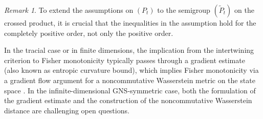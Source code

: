 \documentclass[12pt,a4paper]{amsart}
\newcommand{\1}{\mathds{1}}
\theoremstyle{plain}
\theoremstyle{definition}
\theoremstyle{remark}
\newtheorem{remark}[proposition]{Remark}
\begin{document}
\begin{remark}
    To extend the assumptions on $(P_t)$ to the semigroup $(\tilde P_t)$ on the crossed product, it is crucial that the inequalities in the assumption hold for the completely positive order, not only the positive order.

    In the tracial case or in finite dimensions, the implication from the intertwining criterion to Fisher monotonicity typically passes through a gradient estimate (also known as entropic curvature bound), which implies Fisher monotonicity via a gradient flow argument for a noncommutative Wasserstein metric on the state space \cite{CM17,CM20,WZ21}. In the infinite-dimensional GNS-symmetric case, both the formulation of the gradient estimate and the construction of the noncommutative Wasserstein distance are challenging open questions.
\end{remark}
\end{document}

